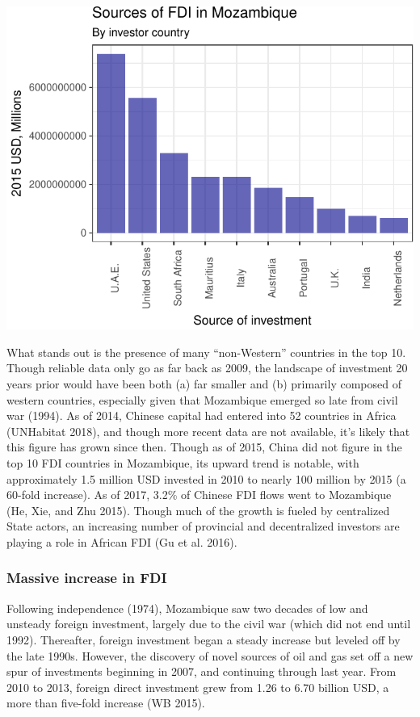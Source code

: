 \documentclass[]{article}
\begin{document}
\begin{center}\includegraphics{figures/unnamed-chunk-7-1} \end{center}

What stands out is the presence of many ``non-Western'' countries in the
top 10. Though reliable data only go as far back as 2009, the landscape
of investment 20 years prior would have been both (a) far smaller and
(b) primarily composed of western countries, especially given that
Mozambique emerged so late from civil war (1994). As of 2014, Chinese
capital had entered into 52 countries in Africa (UNHabitat 2018), and
though more recent data are not available, it's likely that this figure
has grown since then. Though as of 2015, China did not figure in the top
10 FDI countries in Mozambique, its upward trend is notable, with
approximately 1.5 million USD invested in 2010 to nearly 100 million by
2015 (a 60-fold increase). As of 2017, 3.2\% of Chinese FDI flows went
to Mozambique (He, Xie, and Zhu 2015). Though much of the growth is
fueled by centralized State actors, an increasing number of provincial
and decentralized investors are playing a role in African FDI (Gu et al.
2016).

\subsubsection{Massive increase in FDI}\label{massive-increase-in-fdi}

Following independence (1974), Mozambique saw two decades of low and
unsteady foreign investment, largely due to the civil war (which did not
end until 1992). Thereafter, foreign investment began a steady increase
but leveled off by the late 1990s. However, the discovery of novel
sources of oil and gas set off a new spur of investments beginning in
2007, and continuing through last year. From 2010 to 2013, foreign
direct investment grew from 1.26 to 6.70 billion USD, a more than
five-fold increase (WB 2015).
\end{document}

